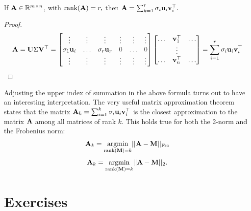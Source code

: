 \begin{proposition}
If $\MA \in \mathbb R^{m \times n}$, with $\rank(\MA) = r,$ then $\MA = \sum_{k = 1}^r \sigma_i \vu_i \vv_i^\top.$ 
\end{proposition}
\begin{proof}
$$\MA = \MU \Sigma  \MV^\top = \begin{bmatrix}
\vdots & \vdots & \vdots & \vdots & \vdots & \vdots \\
\sigma_1 \vu_i  & \ldots & \sigma_r \vu_r & 0 & \ldots & 0 \\
\vdots & \vdots & \vdots & \vdots & \vdots & \vdots
\end{bmatrix} \begin{bmatrix}
\ldots & \vv_1^\top & \ldots \\
& \vdots & \\
\ldots & \vv_n^\top & \ldots 
\end{bmatrix} = \sum_{i =1}^r \sigma_i \vu_i \vv_i^\top$$
\end{proof}

Adjusting the upper index of summation in the above formula turns out to have an interesting interpretation. The very useful matrix approximation theorem states that the matrix $\MA_k = \sum_{i=1}^k\sigma_i\vu_i\vv_i^\top$ is the closest approximation to the matrix $\MA$ among all matrices of rank $k$. This holds true for both the 2-norm and the Frobenius norm:
$$\MA_k = \underset{\rank(\MM) = k}{\argmin}||\MA - \MM||_\Fro$$
$$\MA_k = \underset{\rank(\MM) = k}{\argmin}||\MA - \MM||_2.$$
 
\section{Exercises}

